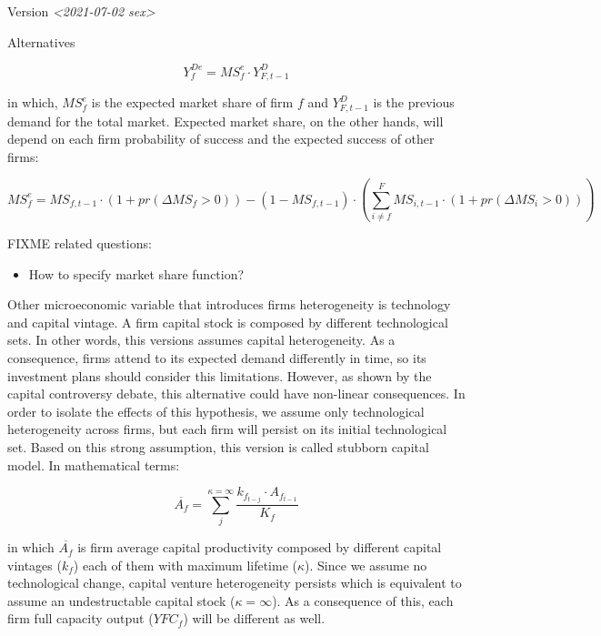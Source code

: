 \documentclass[presentation]{beamer}
\begin{document}
\begin{frame}[label={sec:org60efa21}]{Version \textit{<2021-07-02 sex>}}
\begin{block}{Alternatives}
\begin{latex}
\begin{equation}
Y^{De}_{f} = MS_{f}^{e}\cdot Y^{D}_{F, t-1}
\end{equation}
\end{latex}
in which, \(MS_{f}^{e}\) is the expected market share of firm \(f\) and \(Y^{D}_{F, t-1}\) is the previous demand for the total market.
Expected market share, on the other hands, will depend on each firm probability of success and the expected success of other firms:
\begin{latex}
\begin{equation}
MS_{f}^{e} = MS_{f,t-1} \cdot (1 + pr(\Delta MS_{f} > 0)) - (1-MS_{f,t-1})\cdot \left(\sum_{i \neq f}^{F} MS_{i,t-1} \cdot(1+pr (\Delta MS_{i} > 0))\right)
\end{equation}
\end{latex}


\begin{info}
FIXME related questions:
\begin{itemize}
\item How to specify market share function?
\end{itemize}
\end{info}

Other microeconomic variable that introduces firms heterogeneity is technology and capital vintage.
A firm capital stock is composed by different technological sets.
In other words, this versions assumes capital heterogeneity.
As a consequence, firms attend to its expected demand differently in time, so its investment plans should consider this limitations.
However, as shown by the capital controversy debate, this alternative could have non-linear consequences.
In order to isolate the effects of this hypothesis, we assume only technological heterogeneity across firms, but each firm will persist on its initial technological set.
Based on this strong assumption, this version is called \alert{stubborn capital} model.
In mathematical terms:

\begin{latex}
\begin{equation}
\overline{A_{f}} = \sum_{j}^{\kappa = \infty}\frac{k_{f_{t-j}}\cdot A_{f_{t-1}}}{K_{f}}
\end{equation}
\end{latex}
in which \(\overline{A_{f}}\) is firm average capital productivity composed by different capital vintages (\(k_{f}\)) each of them with maximum lifetime (\(\kappa\)).
Since we assume no technological change, capital venture heterogeneity persists which is equivalent to assume an undestructable capital stock (\(\kappa = \infty\)).
As a consequence of this, each firm full capacity output (\(YFC_{f}\)) will be different as well.


\end{block}
\end{frame}
\end{document}
